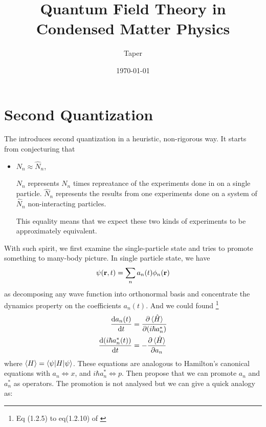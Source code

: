 \documentclass{article}
\title{Quantum Field Theory in Condensed Matter Physics}
\date{\today}
\author{Taper}
\begin{document}
\maketitle
{}
\tableofcontents

\section{Second Quantization}
\label{sec:Second-Quantization}

The \cite{Nagaosa1999} introduces second quantization in a heuristic, non-rigorous
way. It starts from conjecturing that

\begin{itemize}
    \item $N_n\approx \hat{N}_n$, 
        
        $N_n$ represents $N_n$ times repreatance of the experiments done in on a
        single particle. $\hat{N}_n$ represents the results from one experiments
        done on a system of $\hat{N}_n$ non-interacting particles. 
        
        This equality means that we expect these two kinds of experiments to be
        approximately equivalent.
\end{itemize}

With such spirit, we first examine the single-particle state and tries to
promote something to many-body picture. In single particle state, we have
\begin{equation}
    \psi(\vb{r},t) = \sum_n a_n(t) \phi_n(\vb{r})
\end{equation}
as decomposing any wave function into orthonormal basis and concentrate the
dynamics property on the coefficients $a_n(t)$. And we could found
\footnote{Eq (1.2.5) to eq(1.2.10) of \cite{Nagaosa1999}}
\begin{align}
    \frac{\dd a_n(t)}{\dd t} &= 
        \frac{\partial \braket{\hat{H}}}{\partial (i\hbar a^*_n)} \\
    \frac{\dd (i\hbar a_n^*(t))}{\dd t} &= 
        -\frac{\partial \braket{\hat{H}}}{\partial a_n}
\end{align}
where $\braket{H}=\braket{\psi|H|\psi}$. 
These equations are analogous to Hamilton's canonical equations with $a_n
\Leftrightarrow x$, and $i\hbar a^*_n\Leftrightarrow p$. Then propose that we
can promote $a_n$ and $a_n^*$ as operators. The promotion is not analysed but we
can give a quick analogy as:
\end{document}
